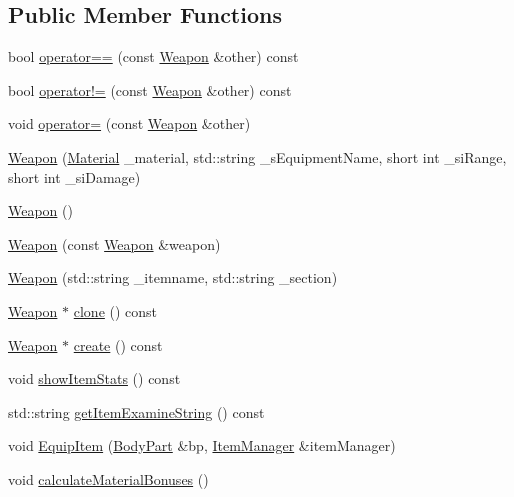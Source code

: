 \subsection*{Public Member Functions}
\begin{DoxyCompactItemize}
\item 
bool \mbox{\hyperlink{class_weapon_a775cb30927bd7d89b9666a1fd9f8ed5f}{operator==}} (const \mbox{\hyperlink{class_weapon}{Weapon}} \&other) const
\item 
bool \mbox{\hyperlink{class_weapon_a3e7097112f2e3e2eff39469af5d610d6}{operator!=}} (const \mbox{\hyperlink{class_weapon}{Weapon}} \&other) const
\item 
void \mbox{\hyperlink{class_weapon_a9a4297ad2057a660e2a7bd2c690f1ada}{operator=}} (const \mbox{\hyperlink{class_weapon}{Weapon}} \&other)
\item 
\mbox{\hyperlink{class_weapon_a832f6d4c8d48728aaf1fe0459bed0dbd}{Weapon}} (\mbox{\hyperlink{class_material}{Material}} \+\_\+material, std\+::string \+\_\+s\+Equipment\+Name, short int \+\_\+si\+Range, short int \+\_\+si\+Damage)
\item 
\mbox{\hyperlink{class_weapon_a42dbc46dd70319a24763992c4ebbd396}{Weapon}} ()
\item 
\mbox{\hyperlink{class_weapon_a167d8c34946b69123ddbb3ce7d739358}{Weapon}} (const \mbox{\hyperlink{class_weapon}{Weapon}} \&weapon)
\item 
\mbox{\hyperlink{class_weapon_a43fa490f1c719993d54294f1c3cf5f50}{Weapon}} (std\+::string \+\_\+itemname, std\+::string \+\_\+section)
\item 
\mbox{\hyperlink{class_weapon}{Weapon}} $\ast$ \mbox{\hyperlink{class_weapon_a4a914fa26d1d67a5d890252950f6b9be}{clone}} () const
\item 
\mbox{\hyperlink{class_weapon}{Weapon}} $\ast$ \mbox{\hyperlink{class_weapon_a0755dc1352391eb484644ab4e4cf144d}{create}} () const
\item 
void \mbox{\hyperlink{class_weapon_a5bd0118be0d84307c0865a63d907fec7}{show\+Item\+Stats}} () const
\item 
std\+::string \mbox{\hyperlink{class_weapon_aa52cecf0a3c34aba70a6425c36d40afa}{get\+Item\+Examine\+String}} () const
\item 
void \mbox{\hyperlink{class_weapon_ab40ee049b9f2a5c3cfdec36750f0842d}{Equip\+Item}} (\mbox{\hyperlink{class_body_part}{Body\+Part}} \&bp, \mbox{\hyperlink{class_item_manager}{Item\+Manager}} \&item\+Manager)
\item 
void \mbox{\hyperlink{class_weapon_ad7be6ba61b660d807b5b56c289defbde}{calculate\+Material\+Bonuses}} ()

\end{DoxyCompactItemize}
